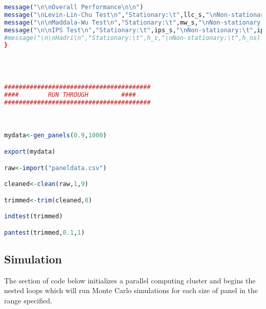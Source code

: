 \begin{lstlisting}[language=R]
message("\n\nOverall Performance\n\n")
message("\nLevin-Lin-Chu Test\n","Stationary:\t",llc_s,"\nNon-stationary:\t",llc_ns)
message("\n\nMaddala-Wu Test\n","Stationary:\t",mw_s,"\nNon-stationary:\t",mw_ns)
message("\n\nIPS Test\n","Stationary:\t",ips_s,"\nNon-stationary:\t",ips_ns)
#message("\n\nHadri\n","Stationary:\t",h_s,"\nNon-stationary:\t",h_ns)
}




########################################
####		RUN THROUGH			####
########################################



mydata<-gen_panels(0.9,1000)

export(mydata)

raw<-import("paneldata.csv")

cleaned<-clean(raw,1,9)

trimmed<-trim(cleaned,8)

indtest(trimmed)

pantest(trimmed,0.1,1)
\end{lstlisting}
\pagebreak



\subsection{Simulation}

The section of code below initializes a parallel computing cluster and begins the nested loops which will run Monte Carlo simulations for each size of panel in the range specified.



